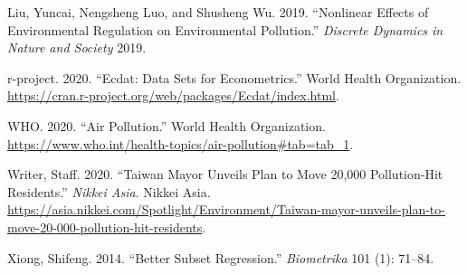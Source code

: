 \documentclass[
]{article}
\begin{document}
\leavevmode\hypertarget{ref-liu2019nonlinear}{}%
Liu, Yuncai, Nengsheng Luo, and Shusheng Wu. 2019. ``Nonlinear Effects
of Environmental Regulation on Environmental Pollution.'' \emph{Discrete
Dynamics in Nature and Society} 2019.

\leavevmode\hypertarget{ref-RstudioData}{}%
r-project. 2020. ``Ecdat: Data Sets for Econometrics.'' World Health
Organization.
\url{https://cran.r-project.org/web/packages/Ecdat/index.html}.

\leavevmode\hypertarget{ref-WHOestimation}{}%
WHO. 2020. ``Air Pollution.'' World Health Organization.
\url{https://www.who.int/health-topics/air-pollution\#tab=tab_1}.

\leavevmode\hypertarget{ref-writer_2020}{}%
Writer, Staff. 2020. ``Taiwan Mayor Unveils Plan to Move 20,000
Pollution-Hit Residents.'' \emph{Nikkei Asia}. Nikkei Asia.
\url{https://asia.nikkei.com/Spotlight/Environment/Taiwan-mayor-unveils-plan-to-move-20-000-pollution-hit-residents}.

\leavevmode\hypertarget{ref-xiong2014better}{}%
Xiong, Shifeng. 2014. ``Better Subset Regression.'' \emph{Biometrika}
101 (1): 71--84.
\end{document}
